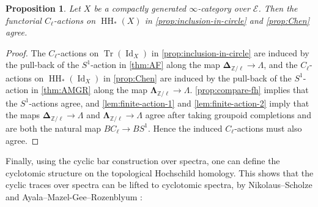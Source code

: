 \documentclass[11pt]{amsart}
\numberwithin{equation}{section}
\theoremstyle{plain}
\newtheorem{Prop}[prop]{Proposition}
\theoremstyle{definition}
\theoremstyle{remark}
\newcommand{\bZ} { {\mathbb{Z}}}
\newcommand{\cE} { {\mathcal{E}}}
\newcommand{\Id}{{\operatorname{Id}}}
\newcommand\HH{\operatorname{HH}}
\newcommand\Tr{\operatorname{Tr}}
\begin{document}
\begin{Prop}\label{prop:compare-fh-finite}
    Let $X$ be a compactly generated $\infty$-category over $\cE$. Then the functorial $C_\ell$-actions on $\HH_*(X)$ in \autoref{prop:inclusion-in-circle} and \autoref{prop:Chen} agree.
\end{Prop}
\begin{proof}
    The $C_\ell$-actions on $\Tr(\Id_X)$ in \autoref{prop:inclusion-in-circle} are induced by the pull-back of the $S^1$-action in \autoref{thm:AF} along the map $\boldsymbol{\Delta}_{\bZ/\ell} \to \Lambda$, and the $C_\ell$-actions on $\HH_*(\Id_X)$ in \autoref{prop:Chen} are induced by the pull-back of the $S^1$-action in \autoref{thm:AMGR} along the map $\boldsymbol{\Lambda}_{\bZ/\ell} \to \Lambda$.  \autoref{prop:compare-fh} implies that the $S^1$-actions agree, and \autoref{lem:finite-action-1} and \ref{lem:finite-action-2} imply that the maps $\boldsymbol{\Delta}_{\bZ/\ell} \to \Lambda$ and $\boldsymbol{\Lambda}_{\bZ/\ell} \to \Lambda$ agree after taking groupoid completions and are both the natural map $BC_\ell \to BS^1$. Hence the induced $C_\ell$-actions must also agree.
\end{proof}


Finally, using the cyclic bar construction over spectra, one can define the cyclotomic structure on the topological Hochschild homology. This shows that the cyclic traces over spectra can be lifted to cyclotomic spectra, by Nikolaus--Scholze \cite{Nikolaus-Scholze-Ontopologicalcyclichomology} and Ayala--Mazel-Gee--Rozenblyum \cite{AMGR-cyclotomic,AMGR-naive}:
\end{document}
